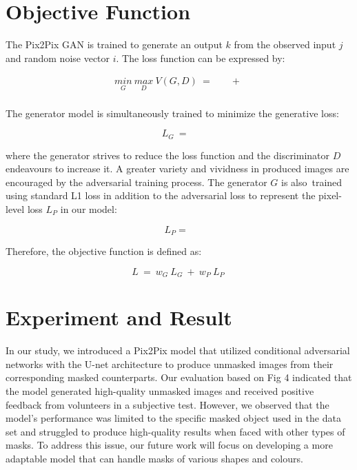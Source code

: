 \documentclass{36_styles/svproc}
\begin{document}
\section{Objective Function}

The Pix2Pix GAN is trained to generate an output $k$ from the observed input $j$ and random noise vector $i$. The loss function can be expressed by:

\begin{equation}
\begin{aligned}
\underset{G}{min}\ \underset{D}{max}\ V(G, D)\ =\ {} & \mathop{\mathbb{E}_{j,k\ \sim\ p_{data}(j, k)} [\log\ D(j, k)]}\ +\ \\
& \mathop{\mathbb{E}_{j\ \sim\ p_{data}(j) , k\ \sim\ p_{data}(k)} [\log\ (1 - D(j, G(j, k)))]}
\label{eq1}
\end{aligned}
\end{equation}

The generator model is simultaneously trained to minimize the generative loss:	

\begin{equation}
L_G\ =\ \mathop{\mathbb{E}_{j\ \sim\ p_{data}(j) , k\ \sim\ p_{data}(k)} [\log\ (1 - D(j, G(j, k)))]}
\label{eq2}
\end{equation}

where the generator strives to reduce the loss function and the discriminator $D$ endeavours to increase it. A greater variety and vividness in produced images are encouraged by the adversarial training process. The generator $G$ is also trained using standard L1 loss in addition to the adversarial loss to represent the pixel-level loss $L_P$ in our model: 

\begin{equation}
L_P = \mathop{\mathbb{E}_{j,k\ \sim\ p_{data}(j,k) , i\ \sim\ p_{data}(i)} [\left\| k - G(j, i) \right\|]}
\label{eq3}
\end{equation}

Therefore, the objective function is defined as:

\begin{equation}
\label{eq4}
L\ =\ w_G\ L_G\ +\ w_P\ L_P\ 
\end{equation}

\section{Experiment and Result}

In our study, we introduced a Pix2Pix model that utilized conditional adversarial networks with the U-net architecture to produce unmasked images from their corresponding masked counterparts. Our evaluation based on Fig 4 indicated that the model generated high-quality unmasked images and received positive feedback from volunteers in a subjective test. However, we observed that the model's performance was limited to the specific masked object used in the data set and struggled to produce high-quality results when faced with other types of masks. To address this issue, our future work will focus on developing a more adaptable model that can handle masks of various shapes and colours.
\end{document}
